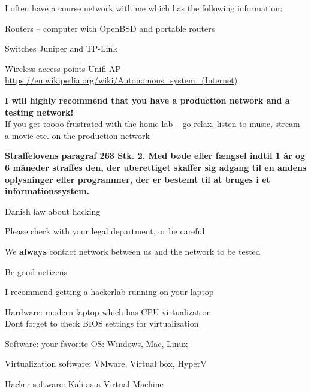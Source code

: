 \documentclass[Screen16to9,17pt]{foils}
\begin{document}
\begin{list1}
\item I often have a course network with me which has the following information:
\begin{list2}
\item Routers -- computer with OpenBSD and portable routers
\item Switches Juniper and TP-Link
\item Wireless access-points Unifi AP
\url{https://en.wikipedia.org/wiki/Autonomous_system_(Internet)}
\end{list2}
\end{list1}

\vskip 2cm
{\bf I will highly recommend that you have a production network and a testing network!}\\
If you get toooo frustrated with the home lab -- go relax, listen to music, stream a movie etc. on the production network \smiley





{\bfseries Straffelovens paragraf 263 Stk. 2. Med bøde eller fængsel indtil 1 år og 6 måneder straffes den, der uberettiget skaffer sig adgang til en andens oplysninger eller programmer, der er bestemt til at bruges i et informationssystem. }

\begin{list2}
\item Danish law about hacking
\item Please check with your legal department, or be careful
\item We {\bf always} contact network between us and the network to be tested
\item Be good netizens
\end{list2}






\begin{list2}
\item I recommend getting a hackerlab running on your laptop
\item Hardware: modern laptop which has CPU virtualization\\
Dont forget to check BIOS settings for virtualization
\item Software: your favorite OS: Windows, Mac, Linux
\item Virtualization software: VMware, Virtual box, HyperV
\item Hacker software: Kali as a Virtual Machine 
\end{list2}
\end{document}
